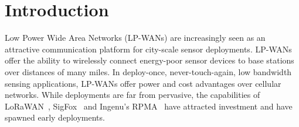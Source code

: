 \section{Introduction}
\label{sec:intro}

\begin{comment}
{\color{blue}
[ANTHONY, SWARUN, BOB]

Key points to cover
\begin{itemize}
\item LPWAN is emerging
\item Unlicensed spectrum $\rightarrow$ uncoordinated
\item Uncoordinated communication with long range $\rightarrow$ poor scaling
\item Coexistence is critical
\item LPWAN is device centric and energy constrained
\item LPWAN is like WiFi (free for all) but in the cellular arena (city-wide/ubiquitous)
\item Contributions are:
\begin{enumerate}
\item Benefits of coordination
\item Network management
\item Techniques and limits of LoRa localization
\item New platforms
\end{enumerate}
\end{itemize}
}
\end{comment}

Low Power Wide Area Networks (LP-WANs) are increasingly seen as an attractive communication platform for city-scale sensor deployments. LP-WANs offer the ability to wirelessly connect energy-poor sensor devices to base stations over distances of many miles. In deploy-once, never-touch-again, low bandwidth sensing applications, LP-WANs offer power and cost advantages over cellular networks.  While deployments are far from pervasive, the capabilities of LoRaWAN~\cite{Sornin2015, LoRaWanAlliance2015}, SigFox~\cite{centenaro2016} and Ingenu's RPMA~\cite{Ingenu2015} have attracted investment and have spawned early deployments.  

